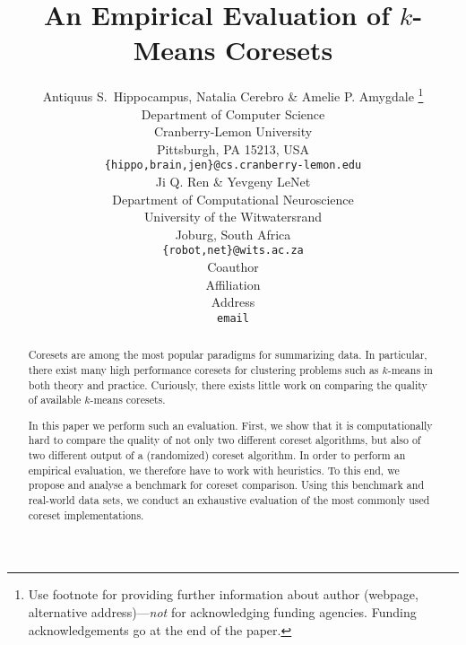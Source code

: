 \documentclass{article} %
\title{An Empirical Evaluation of $k$-Means Coresets}
\author{Antiquus S.~Hippocampus, Natalia Cerebro \& Amelie P. Amygdale \thanks{ Use footnote for providing further information
about author (webpage, alternative address)---\emph{not} for acknowledging
funding agencies.  Funding acknowledgements go at the end of the paper.} \\
Department of Computer Science\\
Cranberry-Lemon University\\
Pittsburgh, PA 15213, USA \\
\texttt{\{hippo,brain,jen\}@cs.cranberry-lemon.edu} \\
\And
Ji Q. Ren \& Yevgeny LeNet \\
Department of Computational Neuroscience \\
University of the Witwatersrand \\
Joburg, South Africa \\
\texttt{\{robot,net\}@wits.ac.za} \\
\AND
Coauthor \\
Affiliation \\
Address \\
\texttt{email}
}
\begin{document}
\maketitle

\begin{abstract}
Coresets are among the most popular paradigms for summarizing data. In particular, there exist many high performance coresets for clustering problems such as $k$-means in both theory and practice. Curiously, there exists little work on comparing the quality of available $k$-means coresets. 

In this paper we perform such an evaluation. First, we show that it is computationally hard to compare the quality of not only two different coreset algorithms, but also of two different output of a (randomized) coreset algorithm.
In order to perform an empirical evaluation, we therefore have to work with heuristics. 
To this end, we propose and analyse a benchmark for coreset comparison. Using this benchmark and real-world data sets, we conduct an exhaustive evaluation of the most commonly used coreset implementations.
\end{abstract}










% 

% 







\end{document}

